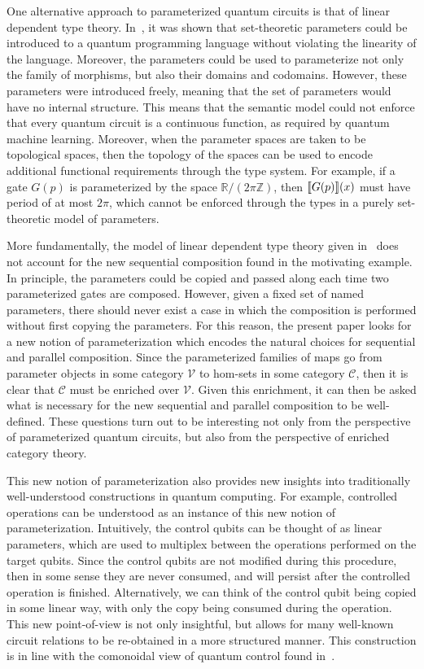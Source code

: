 One alternative approach to parameterized quantum circuits is that of linear dependent type theory.
In~\cite{FuKishida2022}, it was shown that set-theoretic parameters could be introduced to a quantum programming language without violating the linearity of the language.
Moreover, the parameters could be used to parameterize not only the family of morphisms, but also their domains and codomains.
However, these parameters were introduced freely, meaning that the set of parameters would have no internal structure.
This means that the semantic model could not enforce that every quantum circuit is a continuous function, as required by quantum machine learning.
Moreover, when the parameter spaces are taken to be topological spaces, then the topology of the spaces can be used to encode additional functional requirements through the type system.
For example, if a gate $G( p )$ is parameterized by the space $\mathbb{R} / (2\pi \mathbb{Z} )$, then $\llbracket G( p )\rrbracket( x )$ must have period of at most $2\pi$, which cannot be enforced through the types in a purely set-theoretic model of parameters.

More fundamentally, the model of linear dependent type theory given in~\cite{FuKishida2022} does not account for the new sequential composition found in the motivating example.
In principle, the parameters could be copied and passed along each time two parameterized gates are composed.
However, given a fixed set of named parameters, there should never exist a case in which the composition is performed without first copying the parameters.
For this reason, the present paper looks for a new notion of parameterization which encodes the natural choices for sequential and parallel composition.
Since the parameterized families of maps go from parameter objects in some category $\mathcal{V}$ to hom-sets in some category $\mathcal{C}$, then it is clear that $\mathcal{C}$ must be enriched over $\mathcal{V}$.
Given this enrichment, it can then be asked what is necessary for the new sequential and parallel composition to be well-defined.
These questions turn out to be interesting not only from the perspective of parameterized quantum circuits, but also from the perspective of enriched category theory.

This new notion of parameterization also provides new insights into traditionally well-understood constructions in quantum computing.
For example, controlled operations can be understood as an instance of this new notion of parameterization.
Intuitively, the control qubits can be thought of as linear parameters, which are used to multiplex between the operations performed on the target qubits.
Since the control qubits are not modified during this procedure, then in some sense they are never consumed, and will persist after the controlled operation is finished.
Alternatively, we can think of the control qubit being copied in some linear way, with only the copy being consumed during the operation.
This new point-of-view is not only insightful, but allows for many well-known circuit relations to be re-obtained in a more structured manner.
This construction is in line with the comonoidal view of quantum control found in~\cite{HeunenVicary2019}.

